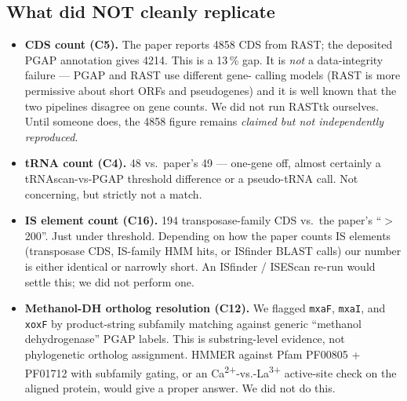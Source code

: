 \documentclass[11pt]{article}
\begin{document}
\subsection*{What did NOT cleanly replicate}
\begin{itemize}
  \item \textbf{CDS count (C5).} The paper reports 4858 CDS from RAST; the
    deposited PGAP annotation gives 4214. This is a 13\,\% gap. It is
    \emph{not} a data-integrity failure --- PGAP and RAST use different gene-
    calling models (RAST is more permissive about short ORFs and pseudogenes)
    and it is well known that the two pipelines disagree on gene counts.
    We did not run RASTtk ourselves. Until someone does, the 4858 figure
    remains \emph{claimed but not independently reproduced}.
  \item \textbf{tRNA count (C4).} 48 vs.\ paper's 49 --- one-gene off, almost
    certainly a tRNAscan-vs-PGAP threshold difference or a pseudo-tRNA call.
    Not concerning, but strictly not a match.
  \item \textbf{IS element count (C16).} 194 transposase-family CDS vs.\ the
    paper's ``$>$200''. Just under threshold. Depending on how the paper
    counts IS elements (transposase CDS, IS-family HMM hits, or ISfinder
    BLAST calls) our number is either identical or narrowly short.
    An ISfinder / ISEScan re-run would settle this; we did not perform one.
  \item \textbf{Methanol-DH ortholog resolution (C12).} We flagged \texttt{mxaF},
    \texttt{mxaI}, and \texttt{xoxF} by product-string subfamily matching
    against generic ``methanol dehydrogenase'' PGAP labels. This is
    substring-level evidence, not phylogenetic ortholog assignment. HMMER
    against Pfam PF00805 + PF01712 with subfamily gating, or an
    Ca\textsuperscript{2+}-vs.-La\textsuperscript{3+} active-site check on
    the aligned protein, would give a proper answer. We did not do this.
\end{itemize}
\end{document}
